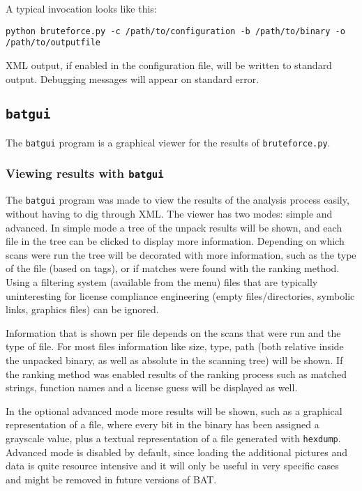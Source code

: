\documentclass[10pt]{article}
\begin{document}
A typical invocation looks like this:

\texttt{python bruteforce.py -c /path/to/configuration -b /path/to/binary -o
/path/to/outputfile}

XML output, if enabled in the configuration file, will be written to standard
output. Debugging messages will appear on standard error.

\subsection{\texttt{batgui}}

The \texttt{batgui} program is a graphical viewer for the results of
\texttt{bruteforce.py}.

\subsubsection{Viewing results with \texttt{batgui}}

The \texttt{batgui} program was made to view the results of the analysis
process easily, without having to dig through XML. The viewer has two modes:
simple and advanced. In simple mode a tree of the unpack results will be shown,
and each file in the tree can be clicked to display more information. Depending
on which scans were run the tree will be decorated with more information, such
as the type of the file (based on tags), or if matches were found with the
ranking method. Using a filtering system (available from the menu) files that
are typically uninteresting for license compliance engineering (empty
files/directories, symbolic links, graphics files) can be ignored.

Information that is shown per file depends on the scans that were run and the
type of file. For most files information like size, type, path (both relative
inside the unpacked binary, as well as absolute in the scanning tree) will be
shown. If the ranking method was enabled results of the ranking process such as
matched strings, function names and a license guess will be displayed as well.

In the optional advanced mode more results will be shown, such as a graphical
representation of a file, where every bit in the binary has been assigned a
grayscale value, plus a textual representation of a file generated with
\texttt{hexdump}. Advanced mode is disabled by default, since loading the
additional pictures and data is quite resource intensive and it will only be
useful in very specific cases and might be removed in future versions of BAT.
\end{document}
